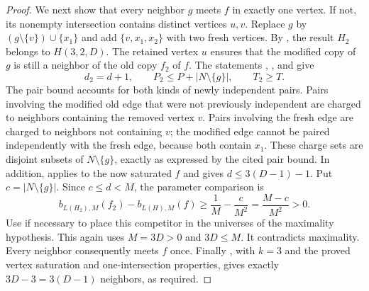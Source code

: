 \begin{proof}
We next show that every neighbor $g$ meets $f$ in exactly one vertex.
If not, its nonempty intersection contains distinct vertices $u,v$.
Replace $g$ by $(g\setminus\{v\})\cup\{x_1\}$ and add
$\{v,x_1,x_2\}$ with two fresh vertices. By
, the result $H_2$
belongs to $H(3,2,D)$. The retained vertex $u$ ensures that the modified
copy of $g$ is still a neighbor of the old copy $f_2$ of $f$. The statements
,
, and
 give
\[
 d_2=d+1,\qquad
 P_2\le P+|N\setminus\{g\}|,\qquad T_2\ge T.
\]
The pair bound accounts for both kinds of newly independent pairs.
Pairs involving the modified old edge that were not previously independent
are charged to neighbors containing the removed vertex $v$.
Pairs involving the fresh edge are charged to neighbors not containing $v$;
the modified edge cannot be paired independently with the fresh edge,
because both contain $x_1$. These charge sets are disjoint subsets of
$N\setminus\{g\}$, exactly as expressed by the cited pair bound.
In addition, 
applies to the now saturated $f$ and gives $d\le3(D-1)-1$.
Put $c=|N\setminus\{g\}|$. Since $c\le d<M$, the parameter comparison is
\[
 b_{L(H_2),M}(f_2)-b_{L(H),M}(f)
 \ge \frac1M-\frac c{M^2}=\frac{M-c}{M^2}>0.
\]
Use  if necessary to place this
competitor in the universes of the maximality hypothesis. This again
uses $M=3D>0$ and $3D\le M$. It
contradicts maximality. Every neighbor consequently meets $f$ once.
Finally , with
$k=3$ and the proved vertex saturation and one-intersection properties,
gives exactly $3D-3=3(D-1)$ neighbors, as required.
\end{proof}
